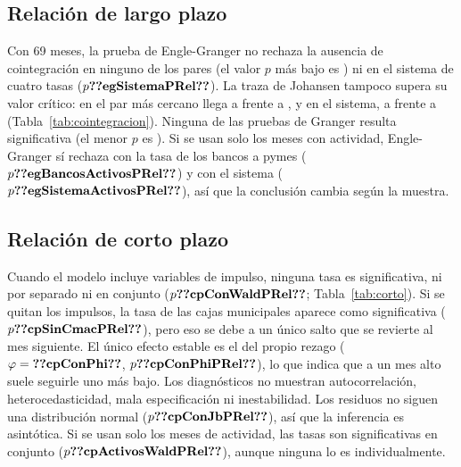 
\subsection{Relación de largo plazo}

Con 69 meses, la prueba de Engle-Granger no rechaza la ausencia de cointegración en ninguno de los pares (el valor $p$ más bajo es ) ni en el sistema de cuatro tasas ($p\cifra{egSistemaPRel}$). La traza de Johansen tampoco supera su valor crítico: en el par más cercano llega a  frente a , y en el sistema, a  frente a  (Tabla~\ref{tab:cointegracion}). Ninguna de las pruebas de Granger resulta significativa (el menor $p$ es ). Si se usan solo los  meses con actividad, Engle-Granger sí rechaza con la tasa de los bancos a pymes ($p\cifra{egBancosActivosPRel}$) y con el sistema ($p\cifra{egSistemaActivosPRel}$), así que la conclusión cambia según la muestra.

\begin{table}[!t]
\caption{Resultados de cointegración y causalidad de Granger (69 meses)}
\label{tab:cointegracion}
\footnotesize

\end{table}


\subsection{Relación de corto plazo}

Cuando el modelo incluye variables de impulso, ninguna tasa es significativa, ni por separado ni en conjunto ($p\cifra{cpConWaldPRel}$; Tabla~\ref{tab:corto}). Si se quitan los impulsos, la tasa de las cajas municipales aparece como significativa ($p\cifra{cpSinCmacPRel}$), pero eso se debe a un único salto que se revierte al mes siguiente. El único efecto estable es el del propio rezago ($\varphi=\cifra{cpConPhi}$, $p\cifra{cpConPhiPRel}$), lo que indica que a un mes alto suele seguirle uno más bajo. Los diagnósticos no muestran autocorrelación, heterocedasticidad, mala especificación ni inestabilidad. Los residuos no siguen una distribución normal ($p\cifra{cpConJbPRel}$), así que la inferencia es asintótica. Si se usan solo los meses de actividad, las tasas son significativas en conjunto ($p\cifra{cpActivosWaldPRel}$), aunque ninguna lo es individualmente.


